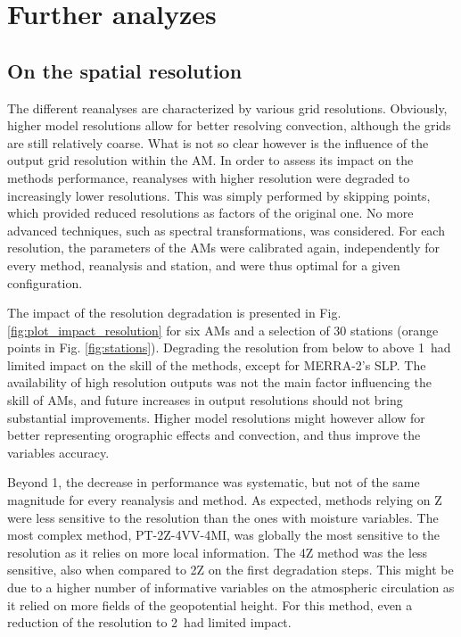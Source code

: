 \documentclass{ametsoc}
\begin{document}
\section{Further analyzes}
\label{sec:analyzes}

\subsection{On the spatial resolution}
\label{sec:resolution}

The different reanalyses are characterized by various grid resolutions. Obviously, higher model resolutions allow for better resolving convection, although the grids are still relatively coarse. What is not so clear however is the influence of the output grid resolution within the AM. In order to assess its impact on the methods performance, reanalyses with higher resolution were degraded to increasingly lower resolutions. This was simply performed by skipping points, which provided reduced resolutions as factors of the original one. No more advanced techniques, such as spectral transformations, was considered. For each resolution, the parameters of the AMs were calibrated again, independently for every method, reanalysis and station, and were thus optimal for a given configuration. 

The impact of the resolution degradation is presented in Fig. \ref{fig:plot_impact_resolution} for six AMs and a selection of 30 stations (orange points in Fig. \ref{fig:stations}). Degrading the resolution from below to above 1\degree\ had limited impact on the skill of the methods, except for MERRA-2's SLP. The availability of high resolution outputs was not the main factor influencing the skill of AMs, and future increases in output resolutions should not bring substantial improvements. Higher model resolutions might however allow for better representing orographic effects and convection, and thus improve the variables accuracy. 

Beyond 1\degree, the decrease in performance was systematic, but not of the same magnitude for every reanalysis and method. As expected, methods relying on Z were less sensitive to the resolution than the ones with moisture variables. The most complex method, PT-2Z-4VV-4MI, was globally the most sensitive to the resolution as it relies on more local information. The 4Z method was the less sensitive, also when compared to 2Z on the first degradation steps. This might be due to a higher number of informative variables on the atmospheric circulation as it relied on more fields of the geopotential height. For this method, even a reduction of the resolution to 2\degree\ had limited impact.
\end{document}
